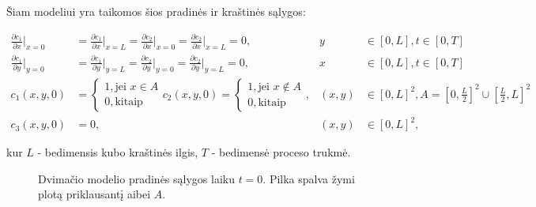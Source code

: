 \documentclass{VUMIFInfKursinis}
\begin{document}
Šiam modeliui yra taikomos šios pradinės ir kraštinės sąlygos:

\begin{align*} \label{2d-init-cond}
    \frac{\partial c_1}{\partial x}\Big|_{x=0}&=\frac{\partial c_1}{\partial x}\Big|_{x=L}=\frac{\partial c_2}{\partial x}\Big|_{x=0}=\frac{\partial c_2}{\partial x}\Big|_{x=L}=0, &y&\in[0,L], t\in[0,T]\\
    \frac{\partial c_1}{\partial y}\Big|_{y=0}&=\frac{\partial c_1}{\partial y}\Big|_{y=L}=\frac{\partial c_2}{\partial y}\Big|_{y=0}=\frac{\partial c_2}{\partial y}\Big|_{y=L}=0, &x&\in[0,L], t\in[0,T]\\
    c_1(x, y, 0) &= 
    \begin{cases}
        1, \text{jei } x\in A\\
        0, \text{kitaip}
    \end{cases}
    c_2(x, y, 0) = 
    \begin{cases}
        1, \text{jei } x\notin A\\
        0, \text{kitaip}
    \end{cases},&(x, y)&\in[0,L]^2, A=\left[0, \tfrac{L}{2}\right]^2\cup\left[\tfrac{L}{2},L\right]^2\\
    c_3(x, y, 0) &= 0,&(x, y)&\in[0,L]^2,
\end{align*}

kur $L$ - bedimensis kubo kraštinės ilgis, $T$ - bedimensė proceso trukmė.

\begin{figure}[h!]
    \centering
    \caption{Dvimačio modelio pradinės sąlygos laiku $t=0$. Pilka spalva žymi plotą priklausantį aibei $A$. }
\end{figure}
\end{document}
